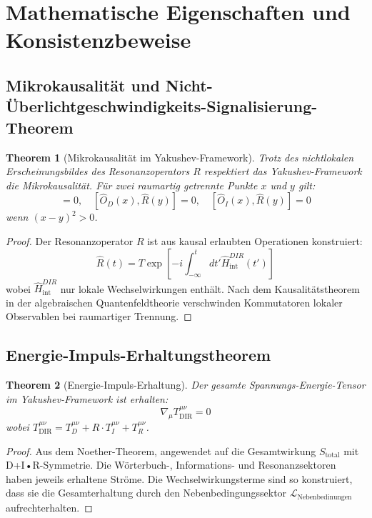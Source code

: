 \documentclass[11pt,a4paper]{article}
\newtheorem{theorem}{Theorem}
\begin{document}
	\section{Mathematische Eigenschaften und Konsistenzbeweise}
	\subsection{Mikrokausalität und Nicht-Überlichtgeschwindigkeits-Signalisierung-Theorem}
	
	\begin{theorem}[Mikrokausalität im Yakushev-Framework]
		Trotz des nichtlokalen Erscheinungsbildes des Resonanzoperators $R$ respektiert das Yakushev-Framework die Mikrokausalität. Für zwei raumartig getrennte Punkte $x$ und $y$ gilt:
		\begin{equation}
			[\hat{O}_D(x), \hat{O}_I(y)] = 0, \quad [\hat{O}_D(x), \hat{R}(y)] = 0, \quad [\hat{O}_I(x), \hat{R}(y)] = 0
		\end{equation}
		wenn $(x-y)^2 > 0$.
	\end{theorem}
	
	\begin{proof}
		Der Resonanzoperator $R$ ist aus kausal erlaubten Operationen konstruiert:
		\begin{equation}
			\hat{R}(t) = T \exp\left[ -i \int_{-\infty}^t dt' \hat{H}_{\text{int}}^{DIR}(t') \right]
		\end{equation}
		wobei $\hat{H}_{\text{int}}^{DIR}$ nur lokale Wechselwirkungen enthält. Nach dem Kausalitätstheorem in der algebraischen Quantenfeldtheorie verschwinden Kommutatoren lokaler Observablen bei raumartiger Trennung.
	\end{proof}
	
	\subsection{Energie-Impuls-Erhaltungstheorem}
	
	\begin{theorem}[Energie-Impuls-Erhaltung]
		Der gesamte Spannungs-Energie-Tensor im Yakushev-Framework ist erhalten:
		\begin{equation}
			\boxed{\nabla_\mu T^{\mu\nu}_{\text{DIR}} = 0}
		\end{equation}
		wobei $T^{\mu\nu}_{\text{DIR}} = T^{\mu\nu}_D + R \cdot T^{\mu\nu}_I + T^{\mu\nu}_R$.
	\end{theorem}
	
	\begin{proof}
		Aus dem Noether-Theorem, angewendet auf die Gesamtwirkung $S_{\text{total}}$ mit D+I•R-Symmetrie. Die Wörterbuch-, Informations- und Resonanzsektoren haben jeweils erhaltene Ströme. Die Wechselwirkungsterme sind so konstruiert, dass sie die Gesamterhaltung durch den Nebenbedingungssektor $\mathcal{L}_{\text{Nebenbedinungen}}$ aufrechterhalten.
	\end{proof}
	
\end{document}

